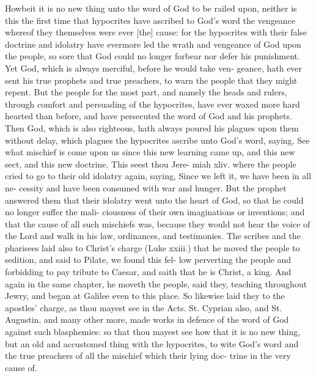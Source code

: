 \documentclass{custom}
\begin{document}
Howbeit it is no new thing unto the word of God to be 
railed upon, neither is this the first time that hypocrites
have ascribed to God's word the vengeance whereof they 
themselves were ever [the] cause: for the hypocrites with
their false doctrine and idolatry have evermore led the wrath
and vengeance of God upon the people, so sore that God
could no longer forbear nor defer his punishment. Yet 
God, which is always merciful, before he would take ven- 
geance, hath ever sent his true prophets and true preachers, 
to warn the people that they might repent. But the people
for the most part, and namely the heads and rulers, through 
comfort and persuading of the hypocrites, have ever waxed 
more hard hearted than before, and have persecuted the 
word of God and his prophets. Then God, which is 
also righteous, hath always poured his plagues upon
them without delay, which plagues the hypocrites 
ascribe unto God's word, saying, See what mischief 
is come upon us since this new learning came up, and this 
new sect, and this new doctrine. This seest thou Jere- 
miah xliv. where the people cried to go to their old idolatry
again, saying, Since we left it, we have been in all ne-
cessity and have been consumed with war and hunger. But 
the prophet answered them that their idolatry went unto the 
heart of God, so that he could no longer suffer the mali- 
ciousness of their own imaginations or inventions; and that 
the cause of all such mischiefs was, because they would not 
hear the voice of the Lord and walk in his law, ordinances, 
and testimonies. The scribes and the pharisees laid also 
to Christ's charge (Luke xxiii.) that he moved the 
people to sedition, and said to Pilate, we found this fel- 
low perverting the people and forbidding to pay tribute to 
Caesar, and saith that he is Christ, a king. And again in the
same chapter, he moveth the people, said they, teaching 
throughout Jewry, and began at Galilee even to this place. 
So likewise laid they to the apostles' charge, as thou mayest 
see in the Acts. St. Cyprian also, and St. Augustin, and 
many other more, made works in defence of the word of 
God against such blasphemies: so that thou mayest see 
how that it is no new thing, but an old and accustomed 
thing with the hypocrites, to wite God's word and the 
true preachers of all the mischief which their lying doc- 
trine in the very cause of.
\end{document}

